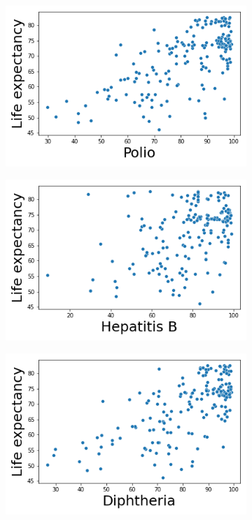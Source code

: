 \begin{itemize}
       
               \begin{figure}[H]
              \centering
              \begin{subfigure}{0.2\linewidth}
                \centering
                \includegraphics[width=\textwidth]{img/9.png}
              \end{subfigure}
              \hfill
                \begin{subfigure}{0.2\linewidth}
                \centering
                \includegraphics[width=\textwidth]{img/10.png}
              \end{subfigure}
              \hfill
                \begin{subfigure}{0.2\linewidth}
                \centering
                \includegraphics[width=\textwidth]{img/11.png}

\end{subfigure}
\end{figure}
\end{itemize}
